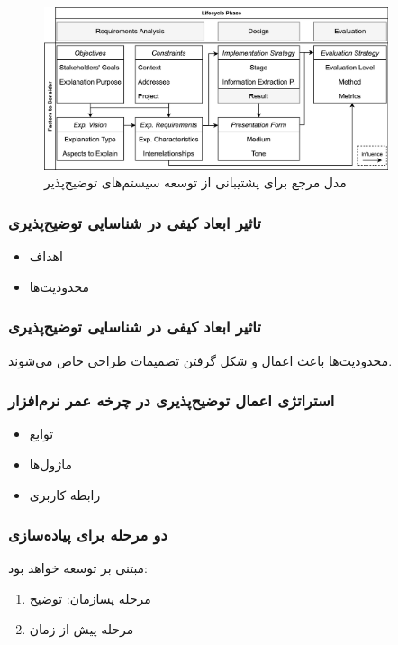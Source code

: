 \documentclass[10pt, a4paper]{beamer}
\begin{document}
\begin{frame}
    \begin{figure}[H]
        \centering
        \includegraphics[width=0.9\textwidth]{images/reference_model.png}
        \caption{مدل مرجع برای پشتیبانی از توسعه سیستم‌های توضیح‌پذیر}
        \label{fig:referenceModel}
    \end{figure}
\end{frame}

\begin{frame}
    \frametitle{تاثیر ابعاد کیفی در شناسایی توضیح‌پذیری}

    \begin{itemize}
        \item اهداف
        \item محدودیت‌ها
    \end{itemize}
\end{frame}

\begin{frame}
    \frametitle{تاثیر ابعاد کیفی در شناسایی توضیح‌پذیری}

    \centering
    محدودیت‌ها باعث اعمال و شکل گرفتن تصمیمات طراحی خاص می‌شوند.
\end{frame}

\begin{frame}
    \frametitle{استراتژی اعمال توضیح‌پذیری در چرخه عمر نرم‌افزار}

    \begin{itemize}
        \item توابع
        \item ماژول‌ها
        \item رابطه کاربری
    \end{itemize}
\end{frame}

\begin{frame}
    \frametitle{دو مرحله برای پیاده‌سازی}
    مبتنی بر توسعه خواهد بود:

    \begin{enumerate}
        \item مرحله پسازمان: توضیح 
        \item مرحله پیش از زمان
    \end{enumerate}
\end{frame}
\end{document}
